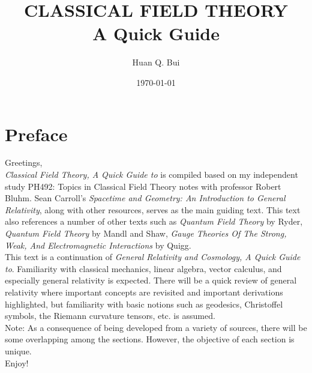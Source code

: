 \documentclass[a4paper,11pt]{article}
\numberwithin{equation}{section}
\theoremstyle{definition}
\begin{document}
\begin{titlepage}\centering
 \clearpage
 \title{\textsc{\bf{CLASSICAL FIELD THEORY}}\\\smallskip A Quick Guide\\}
 \author{\bigskip Huan Q. Bui}
 \date{\today}
 \maketitle
 \thispagestyle{empty}
\end{titlepage}

\newpage

\section*{Preface}

Greetings,\\

\textit{Classical Field Theory, A Quick Guide to} is compiled based on my independent study PH492: Topics in Classical Field Theory notes with professor Robert Bluhm. Sean Carroll's \textit{Spacetime and Geometry: An Introduction to General Relativity}, along with other resources, serves as the main guiding text. This text also references a number of other texts such as \textit{Quantum Field Theory} by Ryder, \textit{Quantum Field Theory} by Mandl and Shaw, \textit{Gauge Theories Of The Strong, Weak, And Electromagnetic Interactions} by Quigg.   \\

This text is a continuation of \textit{General Relativity and Cosmology, A Quick Guide to}. Familiarity with classical mechanics, linear algebra, vector calculus, and especially general relativity is expected. There will be a quick review of general relativity where important concepts are revisited and important derivations highlighted, but familiarity with basic notions such as geodesics, Christoffel symbols, the Riemann curvature tensors, etc. is assumed. \\ 

Note: As a consequence of being developed from a variety of sources, there will be some overlapping among the sections. However, the objective of each section is unique.\\

Enjoy!
\end{document}
